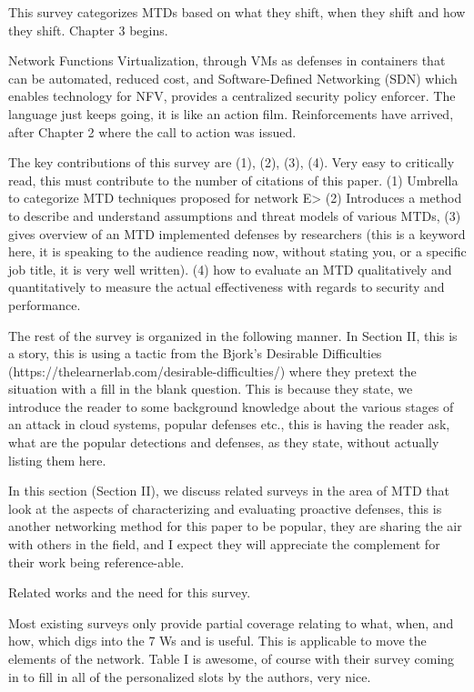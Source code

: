 \documentclass{article}
\begin{document}
{This survey categorizes MTDs based on what they shift, when they shift and how they shift. Chapter 3 begins.

Network Functions Virtualization, through VMs as defenses in containers that can be automated, reduced cost, and Software-Defined Networking (SDN) which enables technology for NFV, provides a centralized security policy enforcer. The language just keeps going, it is like an action film. Reinforcements have arrived, after Chapter 2 where the call to action was issued.

The key contributions of this survey are (1), (2), (3), (4). Very easy to critically read, this must contribute to the number of citations of this paper. (1) Umbrella to categorize MTD techniques proposed for network E> (2) Introduces a method to describe and understand assumptions and threat models of various MTDs, (3) gives overview of an MTD implemented defenses by researchers (this is a keyword here, it is speaking to the audience reading now, without stating you, or a specific job title, it is very well written). (4) how to evaluate an MTD qualitatively and quantitatively to measure the actual effectiveness with regards to security and performance.

The rest of the survey is organized in the following manner. In Section II, this is a story, this is using a tactic from the Bjork’s Desirable Difficulties (https://thelearnerlab.com/desirable-difficulties/) where they pretext the situation with a fill in the blank question. This is because they state, we introduce the reader to some background knowledge about the various stages of an attack in cloud systems, popular defenses etc., this is having the reader ask, what are the popular detections and defenses, as they state, without actually listing them here.

In this section (Section II), we discuss related surveys in the area of MTD that look at the aspects of characterizing and evaluating proactive defenses, this is another networking method for this paper to be popular, they are sharing the air with others in the field, and I expect they will appreciate the complement for their work being reference-able.

Related works and the need for this survey.

Most existing surveys only provide partial coverage relating to what, when, and how, which digs into the 7 Ws and is useful. This is applicable to move the elements of the network. Table I is awesome, of course with their survey coming in to fill in all of the personalized slots by the authors, very nice.

}
\end{document}
